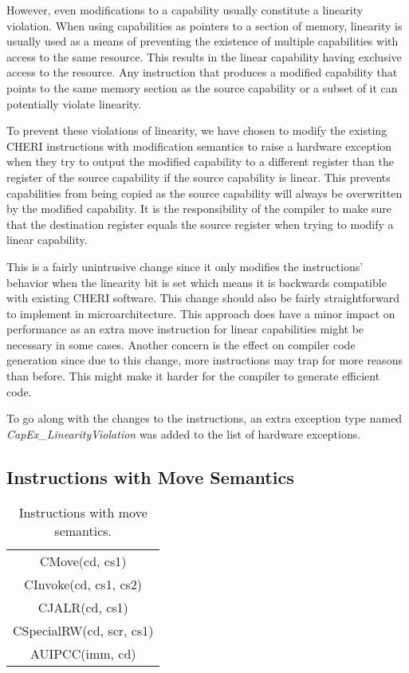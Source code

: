 However, even modifications to a capability usually constitute a linearity violation. When using capabilities as pointers to a section of memory, linearity is usually used as a means of preventing the existence of multiple capabilities with access to the same resource. This results in the linear capability having exclusive access to the resource. Any instruction that produces a modified capability that points to the same memory section as the source capability or a subset of it can potentially violate linearity.

To prevent these violations of linearity, we have chosen to modify the existing CHERI instructions with modification semantics to raise a hardware exception when they try to output the modified capability to a different register than the register of the source capability if the source capability is linear. This prevents capabilities from being copied as the source capability will always be overwritten by the modified capability. It is the responsibility of the compiler to make sure that the destination register equals the source register when trying to modify a linear capability.

This is a fairly unintrusive change since it only modifies the instructions' behavior when the linearity bit is set which means it is backwards compatible with existing CHERI software. This change should also be fairly straightforward to implement in microarchitecture. This approach does have a minor impact on performance as an extra move instruction for linear capabilities might be necessary in some cases. Another concern is the effect on compiler code generation since due to this change, more instructions may trap for more reasons than before. This might make it harder for the compiler to generate efficient code.

To go along with the changes to the instructions, an extra exception type named \textit{CapEx\_LinearityViolation} was added to the list of hardware exceptions.

\subsection{Instructions with Move Semantics}
\begin{table}[h]
\centering
\begin{tabular}{| c |}
\hline
 CMove(cd, cs1) \\
 CInvoke(cd, cs1, cs2) \\
 CJALR(cd, cs1) \\
 CSpecialRW(cd, scr, cs1) \\
 AUIPCC(imm, cd) \\
\hline
\end{tabular}
\caption{Instructions with move semantics.}
\label{table:lininstmove}
\end{table}

